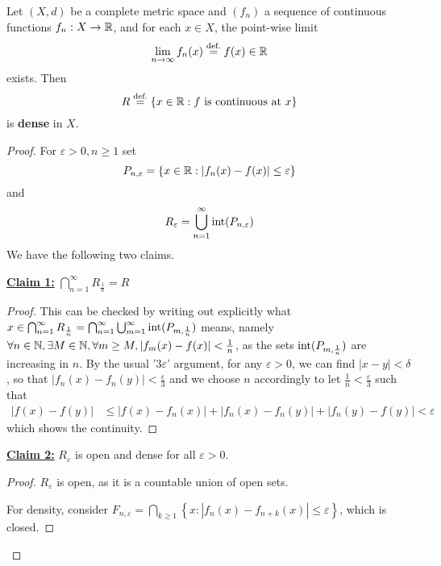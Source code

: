 \documentclass{article}
\begin{document}
\begin{theorem}[Baire]\nl
    Let $(X,d)$ be a complete metric space and $(f_n)$ a sequence of continuous functions $f_n: X \to \mathbb{R}$, and for each $x\in X$, the point-wise limit 
    $$
    \lim_{n\to \infty} f_n(x) \stackrel{\text{def.}}{=} f(x) \in \mathbb{R}
    $$
    exists. Then 
    $$
    R \defeq \left\{ x\in \real: f \ \text{is\ continuous\ at}\ x\right\}
    $$
    is \textbf{dense} in $X$.
\end{theorem}
\begin{proof}
    For $\varepsilon > 0, n\geq 1$ set  
    $$
    P_{n, \varepsilon} = \{x\in \mathbb{R}: |f_n(x)-f(x)|\leq \varepsilon\}
    $$
    and
    $$
    R_\varepsilon = \bigcup_{n=1}^\infty \textrm{int}(P_{n, \varepsilon})
    $$
    We have the following two claims.   
    
    \underline{\textbf{Claim 1:}} $\bigcap_{n=1}^\infty R_{\frac{1}{n}}=R$  
    \begin{proof}
        This can be checked by writing out explicitly what $x \in \bigcap_{n=1}^\infty R_{\frac{1}{n}}=\bigcap_{n=1}^\infty \bigcup_{m=1}^{\infty} \textrm{int}(P_{m,\frac{1}{n}})$ means, namely $\forall n\in \mathbb{N}, \exists M \in \mathbb{N}, \forall m \geq M, |f_m(x)-f(x)|<\frac{1}{n}$, as the sets $\textrm{int}(P_{m,\frac{1}{n}})$ are increasing in $n$. By the usual '$3\varepsilon$' argument, for any $\varepsilon>0$, we can find $|x-y|<\delta$, so that $ |f_n(x)-f_n(y)|<\frac{\varepsilon}{3}$ and we choose $n$ accordingly to let $\frac{1}{n}<\frac{\varepsilon}{3}$ such that
        \begin{align*}
            |f(x)-f(y)|&\leq|f(x)-f_n(x)|+ |f_n(x)-f_n(y)|+|f_n(y)-f(y)| < \varepsilon
        \end{align*}
        which shows the continuity.
    \end{proof}
    
    \underline{\textbf{Claim 2:}} $R_\varepsilon$ is open and dense for all $\varepsilon>0$.  
    \begin{proof}
        $R_\varepsilon$ is open, as it is a countable union of open sets.  

        For density, consider $F_{n,\varepsilon}=\bigcap_{k\geq 1} \left\{ x: |f_n(x)-f_{n+k}(x)|\leq \varepsilon\right\}$, which is closed.  


\end{proof}
\end{proof}
\end{document}
